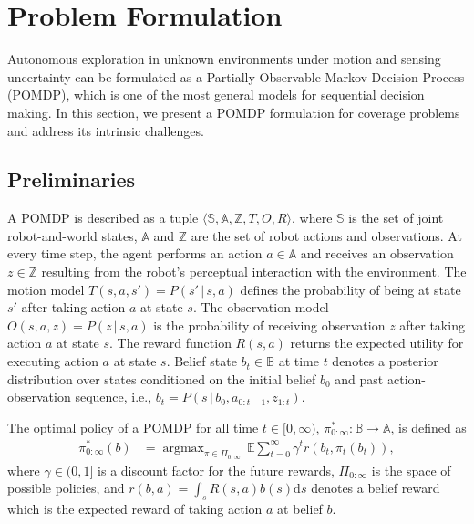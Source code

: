 \documentclass[letterpaper]{article} %
\newcommand{\phdone}[1]{} %
\newcommand{\acomm}[1]{{\color{cyan}Ali:#1}} %
\newcommand{\argmax}{\mathop{\mathrm{argmax}}}
\begin{document}
\section{Problem Formulation}
\label{sec:formulation}

Autonomous exploration in unknown environments under motion and sensing uncertainty can be formulated as a Partially Observable Markov Decision Process (POMDP), which is one of the most general models for sequential decision making.
In this section, we present a POMDP formulation for coverage problems and address its intrinsic challenges.

\subsection{Preliminaries}
\phdone{POMDP Elements}
A POMDP is described as a tuple $\langle \mathbb{S}, \mathbb{A}, \mathbb{Z}, T, O, R \rangle$, where $\mathbb{S}$ is the set of joint robot-and-world states, $\mathbb{A}$ and $\mathbb{Z}$ are the set of robot actions and observations.
At every time step, the agent performs an action $a \in \mathbb{A}$ and receives an observation $z \in \mathbb{Z}$ resulting from the robot's perceptual interaction with the environment.
The motion model $T(s, a, s') = P(s'\,|\,s, a)$ defines the probability of being at state $s'$ after taking action $a$ at state $s$.
The observation model $O(s, a, z) = P(z\,|\,s, a)$ is the probability of receiving observation $z$ after taking action $a$ at state $s$.
The reward function $R(s, a)$ returns the expected utility for executing action $a$ at state $s$.
Belief state $b_t \in \mathbb{B}$ at time $t$ denotes a posterior distribution over states conditioned on the initial belief $b_0$ and past action-observation sequence, i.e., $b_{t} = P(s \,|\, b_0, a_{0:t-1}, z_{1:t})$.

\phdone{POMDP Objective function}
The optimal policy of a POMDP for all time $t \in [0,\infty)$, $\pi_{0:\infty}^* \! : \mathbb{B} \to \mathbb{A}$, is defined as
\begin{align}
  \pi_{0:\infty}^*(b) &= \argmax_{\pi \in \Pi_{0:\infty}} \, \mathbb{E} \sum_{t=0}^{\infty} \gamma^t r(b_t, \pi_t(b_t)),
  \label{eq:objective_function}
\end{align}
where $\gamma \in (0, 1]$ is a discount factor for the future rewards, $\Pi_{0:\infty}$ is the space of possible policies, and $r(b,a)=\int_s R(s,a)b(s)\mathrm{d}s$ denotes a belief reward which is the expected reward of taking action $a$ at belief $b$. %
\end{document}
